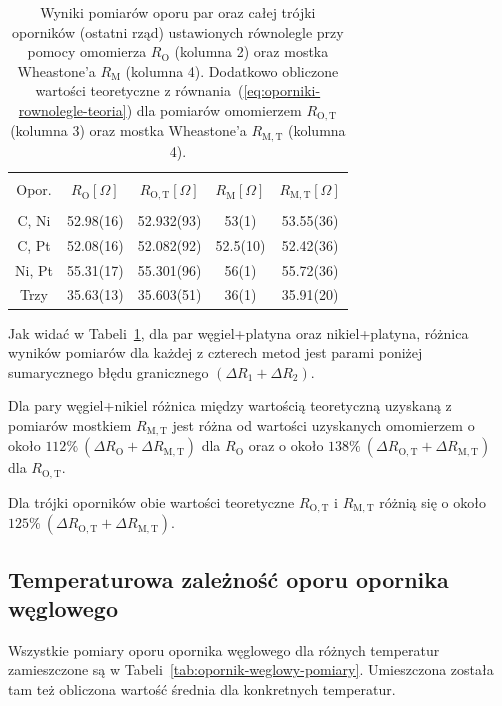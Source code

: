 \documentclass[twocolumn, a4paper, polish, 10pt]{article}
\newcommand{\RO}{\ensuremath{ R_{\mathrm{O}} }}
\newcommand{\RM}{\ensuremath{ R_{\mathrm{M}} }}
\newcommand{\ROT}{\ensuremath{ R_{\mathrm{O, T}} }}
\newcommand{\RMT}{\ensuremath{ R_{\mathrm{M, T}} }}
\begin{document}
\begin{table}[ht]
\begin{center}
\renewcommand*{\tablename}{Tabela}
\caption{\small
Wyniki pomiarów oporu par oraz całej trójki oporników (ostatni rząd) ustawionych równolegle przy pomocy omomierza $\RO$ (kolumna 2) oraz mostka Wheastone’a $\RM$ (kolumna 4).
Dodatkowo obliczone wartości teoretyczne z równania~(\ref{eq:oporniki-rownolegle-teoria}) dla pomiarów omomierzem $\ROT$ (kolumna 3) oraz mostka Wheastone’a $\RMT$ (kolumna 4).
\vspace{0.15cm}
    \label{tab:oporniki-rownolegle-opor}}
    {\small
    \begin{tabular}{c c c c c}
    \hline \vspace{-0.35cm} \\
      Opor. & $\RO[\Omega]$
      & $\ROT[\Omega]$
      & $\RM[\Omega]$
      & $\RMT[\Omega]$ \\
      \hline \vspace{-0.2cm} \\
      C,  Ni & 52.98(16) & 52.932(93) & 53(1)    & 53.55(36) \\
      C,  Pt & 52.08(16) & 52.082(92) & 52.5(10) & 52.42(36) \\
      Ni, Pt & 55.31(17) & 55.301(96) & 56(1)    & 55.72(36) \\
      Trzy   & 35.63(13) & 35.603(51) & 36(1)    & 35.91(20) \\
    \hline
    \end{tabular}}
    \end{center}
\end{table}

Jak widać w Tabeli~\ref{tab:oporniki-rownolegle-opor}, dla par węgiel+platyna oraz nikiel+platyna, różnica wyników pomiarów dla każdej z czterech metod jest parami poniżej sumarycznego błędu granicznego $(\Delta R_1 + \Delta R_2)$.

Dla pary węgiel+nikiel różnica między wartością teoretyczną uzyskaną z pomiarów mostkiem $\RMT$ jest różna od wartości uzyskanych omomierzem 
o około ${112\%~(\Delta \RO + \Delta \RMT)}$ dla $\RO$
oraz o około ${138\%~(\Delta \ROT + \Delta \RMT)}$ dla $\ROT$.

Dla trójki oporników obie wartości teoretyczne $\ROT$ i $\RMT$ różnią się
o około ${125\%~(\Delta \ROT + \Delta \RMT)}$.

\subsection{Temperaturowa zależność oporu opornika węglowego}
Wszystkie pomiary oporu opornika węglowego dla różnych temperatur zamieszczone są w Tabeli~\ref{tab:opornik-weglowy-pomiary}. Umieszczona została tam też obliczona wartość średnia dla konkretnych temperatur.
\end{document}
